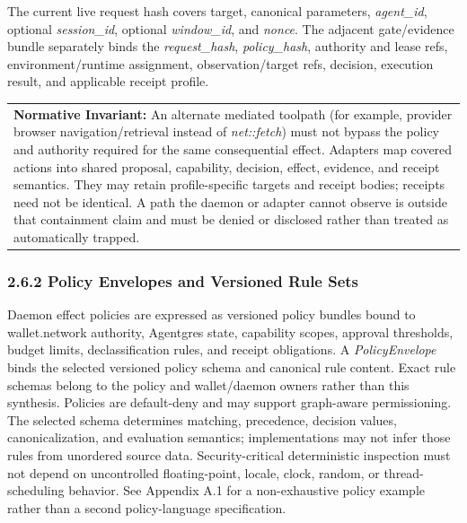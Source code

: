 \documentclass[
  11pt,
]{article}
\begin{document}
The current live request hash covers target, canonical parameters,
\emph{agent\_id}, optional \emph{session\_id}, optional \emph{window\_id}, and
\emph{nonce}. The adjacent gate/evidence bundle separately binds the
\emph{request\_hash}, \emph{policy\_hash}, authority and lease refs,
environment/runtime assignment, observation/target refs, decision, execution
result, and applicable receipt profile.

\begin{longtable}[]{@{}>{\raggedright\arraybackslash}p{\linewidth}@{}}
\toprule\noalign{}
 \\
\midrule\noalign{}
\endhead
\bottomrule\noalign{}
\endlastfoot
\textbf{Normative Invariant:}\emph{\textbf{ }}An alternate mediated toolpath
(for example, provider browser navigation/retrieval instead of
\emph{net::fetch}) must not
bypass the policy and authority required for the same consequential effect.
Adapters map covered actions into shared proposal, capability, decision,
effect, evidence, and receipt semantics. They may retain profile-specific
targets and receipt bodies; receipts need not be identical. A path the daemon
or adapter cannot observe is outside that containment claim and must be denied
or disclosed rather than treated as automatically trapped. \\
\end{longtable}

\hypertarget{actionrules-the-policy-language}{%
\subsubsection{2.6.2 Policy Envelopes and Versioned Rule
Sets}\label{actionrules-the-policy-language}}

Daemon effect policies are expressed as versioned policy bundles bound
to wallet.network authority, Agentgres state, capability scopes,
approval thresholds, budget limits, declassification rules, and receipt
obligations. A \emph{PolicyEnvelope} binds the selected versioned policy
schema and canonical rule content. Exact rule schemas belong to the policy
and wallet/daemon owners rather than this synthesis. Policies are default-deny
and may support graph-aware permissioning. The selected schema determines
matching, precedence, decision values, canonicalization, and evaluation
semantics; implementations may not infer those rules from unordered source
data. Security-critical deterministic inspection must not depend on
uncontrolled floating-point, locale, clock, random, or thread-scheduling
behavior. See Appendix A.1 for a non-exhaustive policy example rather than a
second policy-language specification.
\end{document}
